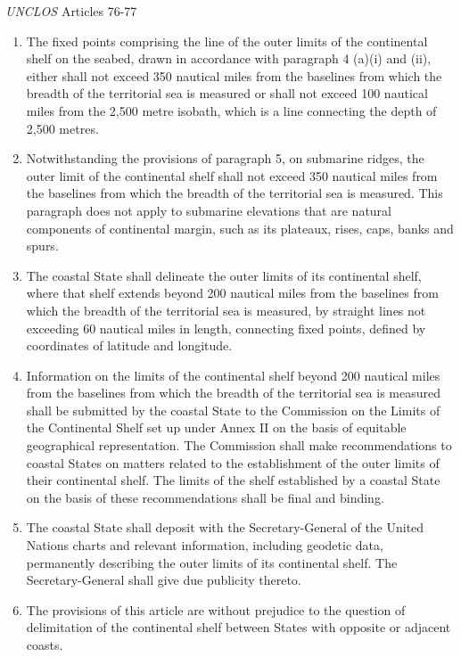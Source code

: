 \begin{conventiondetails}{\textit{UNCLOS} Articles 76-77}
\begin{enumerate}
\begin{enumerate}[label=(\alph*)]
            change in the gradient at its base.
        \end{enumerate}
        \item The fixed points comprising the line of the outer limits of the continental shelf on the seabed, drawn in accordance with paragraph 4 (a)(i) and (ii), either shall not exceed 350 nautical miles from the baselines from which the breadth of the territorial sea is measured or shall not exceed 100 nautical miles from the 2,500 metre isobath, which is a line connecting the depth of 2,500 metres.
        \item Notwithstanding the provisions of paragraph 5, on submarine ridges, the outer limit of the continental shelf shall not exceed 350 nautical miles from the baselines from which the breadth of the territorial sea is measured. This paragraph does not apply to submarine elevations that are natural components of continental margin, such as its plateaux, rises, caps, banks and spurs.
        \item The coastal State shall delineate the outer limits of its continental shelf, where that shelf extends beyond 200 nautical miles from the baselines from which the breadth of the territorial sea is measured, by straight lines not exceeding 60 nautical miles in length, connecting fixed points, defined by coordinates of latitude and longitude.
        \item Information on the limits of the continental shelf beyond 200 nautical miles from the baselines from which the breadth of the territorial sea is measured shall be submitted by the coastal State to the Commission on the Limits of the Continental Shelf set up under Annex II on the basis of equitable geographical representation. The Commission shall make recommendations to coastal States on matters related to the establishment of the outer limits of their continental shelf. The limits of the shelf established by a coastal State on the basis of these recommendations shall be final and binding.
        \item The coastal State shall deposit with the Secretary-General of the United Nations charts and relevant information, including geodetic data, permanently describing the outer limits of its continental shelf. The Secretary-General shall give due publicity thereto.
        \item The provisions of this article are without prejudice to the question of delimitation of the continental shelf between States with opposite or adjacent coasts.
    \end{enumerate}


\end{conventiondetails}
